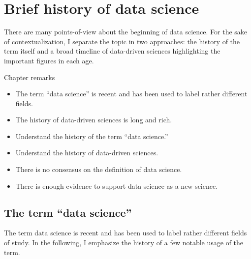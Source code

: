 \chapter{Brief history of data science}
\label{chap:history}


There are many points-of-view about the beginning of data science.  For the sake of
contextualization, I separate the topic in two approaches: the history of the term itself
and a broad timeline of data-driven sciences highlighting the important figures in each
age.

\begin{mainbox}{Chapter remarks}

  \begin{itemize}
    \item The term ``data science'' is recent and has been used to label rather different fields.
    \item The history of data-driven sciences is long and rich.
  \end{itemize}


  \begin{itemize}
    \item Understand the history of the term ``data science.''
    \item Understand the history of data-driven sciences.
  \end{itemize}


  \begin{itemize}
    \item There is no consensus on the definition of data science.
    \item There is enough evidence to support data science as a new science.
  \end{itemize}
\end{mainbox}

\section{The term ``data science''}

The term data science is recent and has been used to label rather different fields of
study.  In the following, I emphasize the history of a few notable usage of the term.


